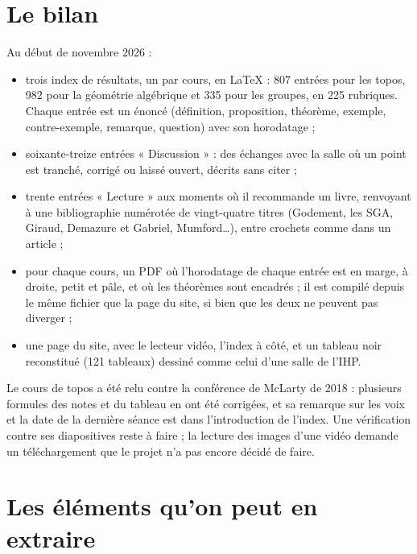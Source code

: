 \section{Le bilan}

Au début de novembre 2026 :
\begin{itemize}
  \item trois index de résultats, un par cours, en LaTeX : 807 entrées pour les topos, 982
        pour la géométrie algébrique et 335 pour les groupes, en 225 rubriques. Chaque
        entrée est un énoncé (définition, proposition, théorème, exemple,
        contre-exemple, remarque, question) avec son horodatage ;
  \item soixante-treize entrées « Discussion » : des échanges avec la salle où un point est
        tranché, corrigé ou laissé ouvert, décrits sans citer ;
  \item trente entrées « Lecture » aux moments où il recommande un livre, renvoyant à une
        bibliographie numérotée de vingt-quatre titres (Godement, les SGA, Giraud, Demazure
        et Gabriel, Mumford…), entre crochets comme dans un article ;
  \item pour chaque cours, un PDF où l'horodatage de chaque entrée est en marge, à droite,
        petit et pâle, et où les théorèmes sont encadrés ; il est compilé depuis le même
        fichier que la page du site, si bien que les deux ne peuvent pas diverger ;
  \item une page du site, avec le lecteur vidéo, l'index à côté, et un tableau noir
        reconstitué (121 tableaux) dessiné comme celui d'une salle de l'IHP.
\end{itemize}

Le cours de topos a été relu contre la conférence de McLarty de 2018 : plusieurs
formules des notes et du tableau en ont été corrigées, et sa remarque sur les voix et la
date de la dernière séance est dans l'introduction de l'index. Une vérification contre ses
diapositives reste à faire ; la lecture des images d'une vidéo demande un téléchargement
que le projet n'a pas encore décidé de faire.

\section{Les éléments qu'on peut en extraire}

